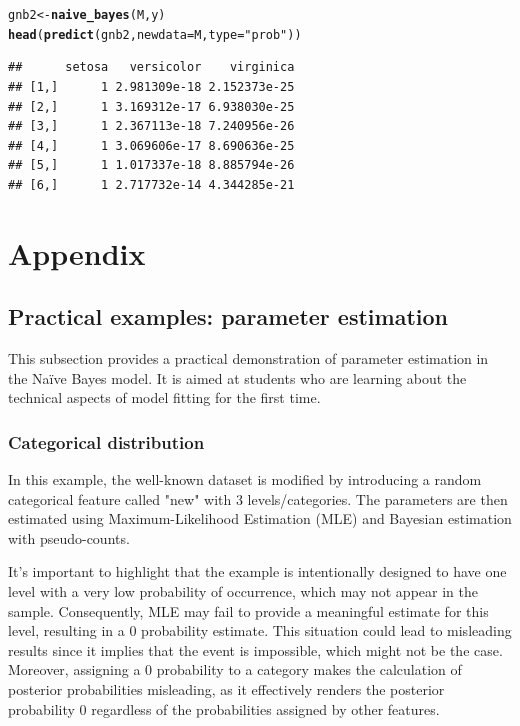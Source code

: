 \documentclass{article}\usepackage[]{graphicx}\usepackage[]{xcolor}
\makeatletter
\newcommand{\hlstr}[1]{\textcolor[rgb]{0.192,0.494,0.8}{#1}}%
\newcommand{\hlstd}[1]{\textcolor[rgb]{0.345,0.345,0.345}{#1}}%
\newcommand{\hlkwb}[1]{\textcolor[rgb]{0.69,0.353,0.396}{#1}}%
\newcommand{\hlkwc}[1]{\textcolor[rgb]{0.333,0.667,0.333}{#1}}%
\newcommand{\hlkwd}[1]{\textcolor[rgb]{0.737,0.353,0.396}{\textbf{#1}}}%
\newenvironment{kframe}{%
 \def\at@end@of@kframe{}%
 \ifinner\ifhmode%
  \def\at@end@of@kframe{\end{minipage}}%
  \begin{minipage}{\columnwidth}%
 \fi\fi%
 \def\FrameCommand##1{\hskip\@totalleftmargin \hskip-\fboxsep
 \colorbox{shadecolor}{##1}\hskip-\fboxsep
     \hskip-\linewidth \hskip-\@totalleftmargin \hskip\columnwidth}%
 \MakeFramed {\advance\hsize-\width
   \@totalleftmargin\z@ \linewidth\hsize
   \@setminipage}}%
 {\par\unskip\endMakeFramed%
 \at@end@of@kframe}
\newenvironment{knitrout}{}{} %
\makeatother
\begin{document}
\begin{knitrout}
\begin{kframe}
\begin{alltt}
\hlstd{gnb2} \hlkwb{<-} \hlkwd{naive_bayes}\hlstd{(M, y)}
\hlkwd{head}\hlstd{(}\hlkwd{predict}\hlstd{(gnb2,} \hlkwc{newdata} \hlstd{= M,} \hlkwc{type} \hlstd{=} \hlstr{"prob"}\hlstd{))}
\end{alltt}
\begin{verbatim}
##      setosa   versicolor    virginica
## [1,]      1 2.981309e-18 2.152373e-25
## [2,]      1 3.169312e-17 6.938030e-25
## [3,]      1 2.367113e-18 7.240956e-26
## [4,]      1 3.069606e-17 8.690636e-25
## [5,]      1 1.017337e-18 8.885794e-26
## [6,]      1 2.717732e-14 4.344285e-21
\end{verbatim}
\end{kframe}
\end{knitrout}


\break

\section{Appendix}

\subsection{Practical examples: parameter estimation}

This subsection provides a practical demonstration of parameter estimation in the Na\"ive Bayes model. It is aimed at students who are learning about the technical aspects of model fitting for the first time.

\subsubsection{Categorical distribution}

In this example, the well-known \textcolor{darkgreen}{{}} dataset is modified by introducing a random categorical feature called "new" with 3 levels/categories. The parameters are then estimated using Maximum-Likelihood Estimation (MLE) and Bayesian estimation with pseudo-counts.

It's important to highlight that the example is intentionally designed to have one level with a very low probability of occurrence, which may not appear in the sample. Consequently, MLE may fail to provide a meaningful estimate for this level, resulting in a 0 probability estimate. This situation could lead to misleading results since it implies that the event is impossible, which might not be the case. Moreover, assigning a 0 probability to a category makes the calculation of posterior probabilities misleading, as it effectively renders the posterior probability 0 regardless of the probabilities assigned by other features.
\end{document}
